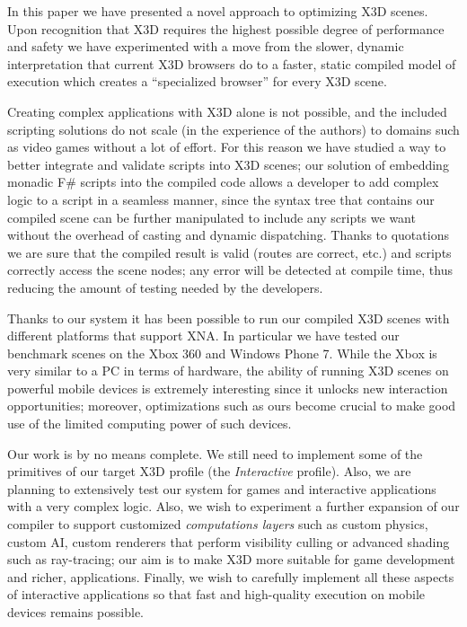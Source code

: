 
In this paper we have presented a novel approach to optimizing X3D scenes. Upon recognition that X3D requires the highest possible degree of performance and safety we have experimented with a move from the slower, dynamic interpretation that current X3D browsers do to a faster, static compiled model of execution which creates a ``specialized browser'' for every X3D scene.

Creating complex applications with X3D alone is not possible, and the included scripting solutions do not scale (in the experience of the authors) to domains such as video games without a lot of effort. For this reason we have studied a way to better integrate and validate scripts into X3D scenes; our solution of embedding monadic F\# scripts into the compiled code allows a developer to add complex logic to a script in a seamless manner, since the syntax tree that contains our compiled scene can be further manipulated to include any scripts we want without the overhead of casting and dynamic dispatching. Thanks to quotations we are sure that the compiled result is valid (routes are correct, etc.) and scripts correctly access the scene nodes; any error will be detected at compile time, thus reducing the amount of testing needed by the developers.

Thanks to our system it has been possible to run our compiled X3D scenes with different platforms that support XNA. In particular we have tested our benchmark scenes on the Xbox 360 and Windows Phone 7. While the Xbox is very similar to a PC in terms of hardware, the ability of running X3D scenes on powerful mobile devices is extremely interesting since it unlocks new interaction opportunities; moreover, optimizations such as ours become crucial to make good use of the limited computing power of such devices.

Our work is by no means complete. We still need to implement some of the primitives of our target X3D profile (the \textit{Interactive} profile). Also, we are planning to extensively test our system for games and interactive applications with a very complex logic. Also, we wish to experiment a further expansion of our compiler to support customized \textit{computations layers} such as custom physics, custom AI, custom renderers that perform visibility culling or advanced shading such as ray-tracing; our aim is to make X3D more suitable for game development and richer, applications. Finally, we wish to carefully implement all these aspects of interactive applications so that fast and high-quality execution on mobile devices remains possible.
